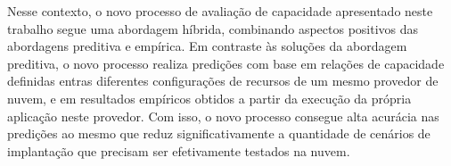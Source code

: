 \documentclass[10pt,conference,compsocconf]{IEEEtran}
\begin{document}
Nesse contexto, o novo processo de avaliação de capacidade apresentado neste trabalho segue uma abordagem híbrida, combinando aspectos positivos das abordagens preditiva e empírica. Em contraste às soluções da abordagem preditiva, o novo processo realiza predições com base em relações de capacidade definidas entras diferentes configurações de recursos de um mesmo provedor de nuvem, e em resultados empíricos obtidos a partir da execução da própria aplicação neste provedor. Com isso, o novo processo consegue alta acurácia nas predições ao mesmo que reduz significativamente a quantidade de cenários de implantação que precisam ser efetivamente testados na nuvem. 


%
%



%
%
\end{document}
